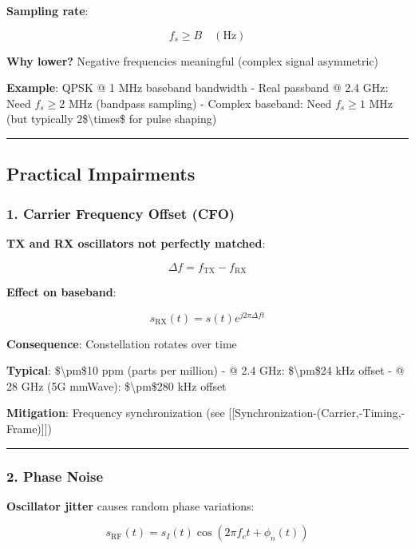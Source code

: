 \textbf{Sampling rate}:

\[
f_s \geq B \quad (\text{Hz})
\]

\textbf{Why lower?} Negative frequencies meaningful (complex signal
asymmetric)

\textbf{Example}: QPSK @ 1 MHz baseband bandwidth - Real passband @ 2.4
GHz: Need \(f_s \geq 2\) MHz (bandpass sampling) - Complex baseband:
Need \(f_s \geq 1\) MHz (but typically 2\$\textbackslash times\$ for
pulse shaping)

\begin{center}\rule{0.5\linewidth}{0.5pt}\end{center}

\subsection{Practical Impairments}\label{practical-impairments}

\subsubsection{1. Carrier Frequency Offset
(CFO)}\label{carrier-frequency-offset-cfo}

\textbf{TX and RX oscillators not perfectly matched}:

\[
\Delta f = f_{\text{TX}} - f_{\text{RX}}
\]

\textbf{Effect on baseband}:

\[
s_{\text{RX}}(t) = s(t) e^{j2\pi \Delta f t}
\]

\textbf{Consequence}: Constellation rotates over time

\textbf{Typical}: \$\textbackslash pm\$10 ppm (parts per million) - @
2.4 GHz: \$\textbackslash pm\$24 kHz offset - @ 28 GHz (5G mmWave):
\$\textbackslash pm\$280 kHz offset

\textbf{Mitigation}: Frequency synchronization (see
{[}{[}Synchronization-(Carrier,-Timing,-Frame){]}{]})

\begin{center}\rule{0.5\linewidth}{0.5pt}\end{center}

\subsubsection{2. Phase Noise}\label{phase-noise}

\textbf{Oscillator jitter} causes random phase variations:

\[
s_{\text{RF}}(t) = s_I(t) \cos(2\pi f_c t + \phi_n(t))
\]

